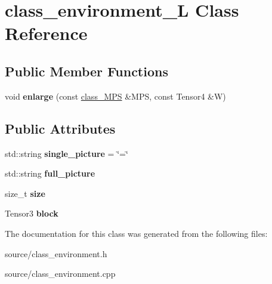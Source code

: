 \hypertarget{classclass__environment___l}{}\section{class\+\_\+environment\+\_\+L Class Reference}
\label{classclass__environment___l}
\subsection*{Public Member Functions}
\begin{DoxyCompactItemize}
\item 
void {\bfseries enlarge} (const \hyperlink{classclass___m_p_s}{class\+\_\+\+M\+PS} \&M\+PS, const Tensor4 \&W)\hypertarget{classclass__environment___l_a1aff2b359287769e1480c5fd009e9598}{}\label{classclass__environment___l_a1aff2b359287769e1480c5fd009e9598}

\end{DoxyCompactItemize}
\subsection*{Public Attributes}
\begin{DoxyCompactItemize}
\item 
std\+::string {\bfseries single\+\_\+picture} = \char`\"{}=\char`\"{}\hypertarget{classclass__environment___l_ae8a9aef9f983ff0580d7e2ee9da1d1d9}{}\label{classclass__environment___l_ae8a9aef9f983ff0580d7e2ee9da1d1d9}

\item 
std\+::string {\bfseries full\+\_\+picture}\hypertarget{classclass__environment___l_a23e47a92e53782577bd904f5e18144e1}{}\label{classclass__environment___l_a23e47a92e53782577bd904f5e18144e1}

\item 
size\+\_\+t {\bfseries size}\hypertarget{classclass__environment___l_a690268d261062405772cec9e303e86d7}{}\label{classclass__environment___l_a690268d261062405772cec9e303e86d7}

\item 
Tensor3 {\bfseries block}\hypertarget{classclass__environment___l_a1ea7d593c41cf3797a2db082e7a40cb8}{}\label{classclass__environment___l_a1ea7d593c41cf3797a2db082e7a40cb8}

\end{DoxyCompactItemize}


The documentation for this class was generated from the following files\+:\begin{DoxyCompactItemize}
\item 
source/class\+\_\+environment.\+h\item 
source/class\+\_\+environment.\+cpp\end{DoxyCompactItemize}
